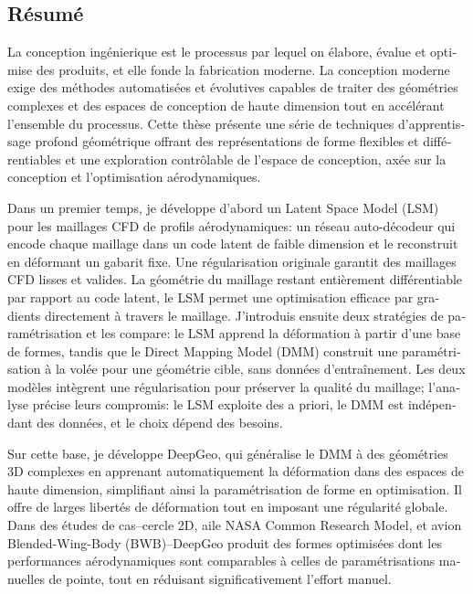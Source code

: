 \begin{otherlanguage}{french}
\cleardoublepage
\chapter*{Résumé}

La conception ingénierique est le processus par lequel on élabore, évalue et optimise des produits, et elle fonde la fabrication moderne. La conception moderne exige des méthodes automatisées et évolutives capables de traiter des géométries complexes et des espaces de conception de haute dimension tout en accélérant l’ensemble du processus. Cette thèse présente une série de techniques d’apprentissage profond géométrique offrant des représentations de forme flexibles et différentiables et une exploration contrôlable de l’espace de conception, axée sur la conception et l’optimisation aérodynamiques.

Dans un premier temps, je développe d’abord un Latent Space Model (LSM) pour les maillages CFD de profils aérodynamiques: un réseau auto-décodeur qui encode chaque maillage dans un code latent de faible dimension et le reconstruit en déformant un gabarit fixe. Une régularisation originale garantit des maillages CFD lisses et valides. La géométrie du maillage restant entièrement différentiable par rapport au code latent, le LSM permet une optimisation efficace par gradients directement à travers le maillage. J’introduis ensuite deux stratégies de paramétrisation et les compare: le LSM apprend la déformation à partir d’une base de formes, tandis que le Direct Mapping Model (DMM) construit une paramétrisation à la volée pour une géométrie cible, sans données d’entraînement. Les deux modèles intègrent une régularisation pour préserver la qualité du maillage; l’analyse précise leurs compromis: le LSM exploite des a priori, le DMM est indépendant des données, et le choix dépend des besoins.

Sur cette base, je développe DeepGeo, qui généralise le DMM à des géométries 3D complexes en apprenant automatiquement la déformation dans des espaces de haute dimension, simplifiant ainsi la paramétrisation de forme en optimisation. Il offre de larges libertés de déformation tout en imposant une régularité globale. Dans des études de cas--cercle 2D, aile NASA Common Research Model, et avion Blended-Wing-Body (BWB)--DeepGeo produit des formes optimisées dont les performances aérodynamiques sont comparables à celles de paramétrisations manuelles de pointe, tout en réduisant significativement l’effort manuel.


\end{otherlanguage}
